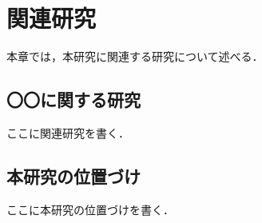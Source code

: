 \chapter{関連研究}\label{chap:related-work}
本章では，本研究に関連する研究について述べる．

\section{〇〇に関する研究}
ここに関連研究を書く\cite{sample-article}\cite{sample-proceedings}．

\section{本研究の位置づけ}
ここに本研究の位置づけを書く．
